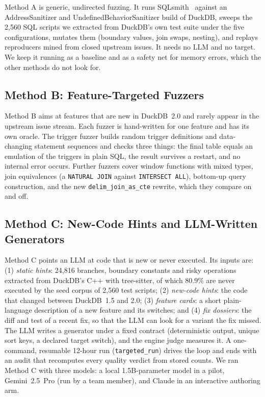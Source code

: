 Method A is generic, undirected fuzzing. It runs SQLsmith~\cite{sqlsmith} against an AddressSanitizer and
UndefinedBehaviorSanitizer build of DuckDB, sweeps the 2{,}560 SQL scripts we extracted from DuckDB's own test suite
under the five configurations, mutates them (boundary values, join swaps, nesting), and replays reproducers mined from
closed upstream issues. It needs no LLM and no target. We keep it running as a baseline and as a safety net for memory
errors, which the other methods do not look for.

\subsection{Method B: Feature-Targeted Fuzzers}
\label{sec:method-b}

Method B aims at features that are new in DuckDB~2.0 and rarely appear in the upstream issue stream. Each fuzzer is
hand-written for one feature and has its own oracle. The trigger fuzzer builds random trigger definitions and
data-changing statement sequences and checks three things: the final table equals an emulation of the triggers in
plain SQL, the result survives a restart, and no internal error occurs. Further fuzzers cover window functions with
mixed types, join equivalences (a \texttt{NATURAL JOIN} against \texttt{INTERSECT ALL}), bottom-up query
construction, and the new \texttt{delim\_join\_as\_cte} rewrite, which they compare on and off.

\subsection{Method C: New-Code Hints and LLM-Written Generators}
\label{sec:method-c}

Method C points an LLM at code that is new or never executed. Its inputs are: (1) \emph{static hints}: 24{,}816
branches, boundary constants and risky operations extracted from DuckDB's C++ with tree-sitter, of which 80.9\% are
never executed by the seed corpus of 2{,}560 test scripts; (2) \emph{new-code hints}: the code that changed between
DuckDB~1.5 and 2.0; (3) \emph{feature cards}: a short plain-language description of a new feature and its switches; and
(4) \emph{fix dossiers}: the diff and test of a recent fix, so that the LLM can look for a variant the fix missed. The
LLM writes a generator under a fixed contract (deterministic output, unique sort keys, a declared target switch), and
the engine judge measures it. A one-command, resumable 12-hour run (\texttt{targeted\_run}) drives the loop and ends
with an audit that recomputes every quality verdict from stored counts. We ran Method C with three models: a local
1.5B-parameter model in a pilot, Gemini~2.5~Pro (run by a team member), and Claude in an interactive authoring arm.

